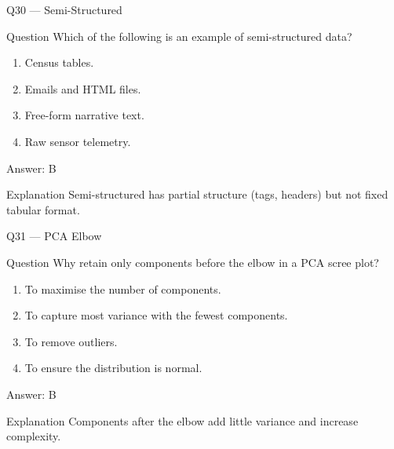 \documentclass[aspectratio=169,8pt]{beamer}
\begin{document}
	\begin{frame}{Q30 --- Semi-Structured}
		\begin{block}{Question}
			Which of the following is an example of semi-structured data?
		\end{block}
		\begin{enumerate}
			\item Census tables.
			\item Emails and HTML files.
			\item Free-form narrative text.
			\item Raw sensor telemetry.
		\end{enumerate}
		\begin{exampleblock}{Answer: B}\end{exampleblock}
		\begin{block}{Explanation}
			Semi-structured has partial structure (tags, headers) but not fixed tabular format.
		\end{block}
	\end{frame}
	
	\begin{frame}{Q31 --- PCA Elbow}
		\begin{block}{Question}
			Why retain only components before the elbow in a PCA scree plot?
		\end{block}
		\begin{enumerate}
			\item To maximise the number of components.
			\item To capture most variance with the fewest components.
			\item To remove outliers.
			\item To ensure the distribution is normal.
		\end{enumerate}
		\begin{exampleblock}{Answer: B}\end{exampleblock}
		\begin{block}{Explanation}
			Components after the elbow add little variance and increase complexity.
		\end{block}
	\end{frame}
	
\end{document}
